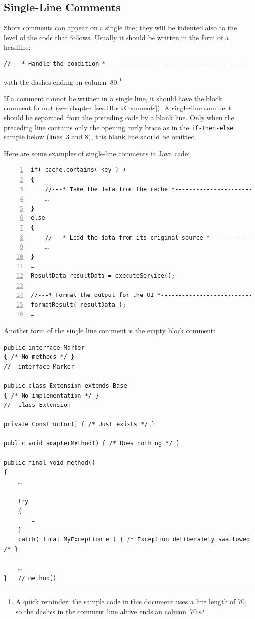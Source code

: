 \documentclass[11pt,a4paper, titlepage, parskip=half, headsepline, footsepline, cleardoublepage=current, headheight=1cm]{scrbook}
\newcommand*{\tqref}[1]{\hyperref[{#1}]{\ref*{#1}}}
\begin{document}
 
\subsection{Single-Line Comments}\label{sec:SingleLineComments}
Short comments can appear on a single line; they will be indented also to the level of the code that follows. Usually it should be written in the form of a headline:
\begin{lstlisting}
//---* Handle the condition *----------------------------------------
\end{lstlisting}
with the dashes ending on column~80.\footnote{A quick reminder: the sample code in this document uses a line length of 70, so the dashes in the comment line above ends an column~70.}

If a comment cannot be written in a single line, it should have the block comment format (see chapter \tqref{sec:BlockComments}). A single-line comment should be separated from the preceding code by a blank line. Only when the preceding line contains only the opening curly brace as in the \lstinline|if-then-else| sample below (lines~3 and 8), this blank line should be omitted. 

Here are some examples of single-line comments in Java code:
\begin{lstlisting}[numbers=left]
if( cache.contains( key ) )
{
    //---* Take the data from the cache *----------------------------
    …
}
else
{
    //---* Load the data from its original source *------------------
    …
}
…
ResultData resultData = executeService();

//---* Format the output for the UI *--------------------------------
formatResult( resultData );
…
\end{lstlisting}

Another form of the single line comment is the empty block comment:
\begin{lstlisting}
public interface Marker
{ /* No methods */ }
//  interface Marker

public class Extension extends Base
{ /* No implementation */ }
//  class Extension

private Constructor() { /* Just exists */ }

public void adapterMethod() { /* Does nothing */ }

public final void method()
{
    …

    try
    {
        …
    }
    catch( final MyException e ) { /* Exception deliberately swallowed /* }

    …
}   // method()
\end{lstlisting}
\end{document}
